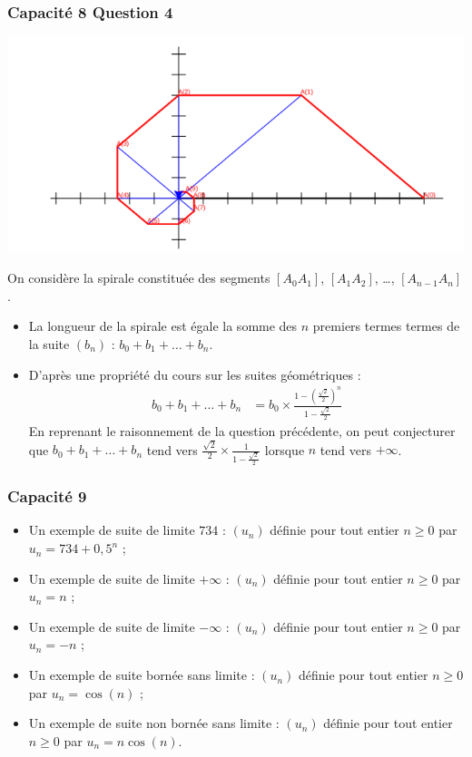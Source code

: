 \documentclass[11pt, hyperref={urlcolor=red,%
            linkcolor=blue, %
            colorlinks=true}]{beamer}
\begin{document}
\begin{frame}
\frametitle{Capacité 8 Question 4}


\begin{center}
\includegraphics[scale=0.15]{images/capacite8.png}
\end{center}



On considère la  spirale constituée des segments $[A_{0}A_{1}]$, $[A_{1}A_{2}]$, \ldots, $[A_{n-1}A_{n}]$. 

\begin{itemize}
	\pause \item La longueur de la spirale est égale  la somme des $n$ premiers termes termes de la suite $(b_{n})$ : $b_{0}+b_{1}+\ldots + b_{n}$.
	
	
\pause \item D'après une propriété du cours sur les suites géométriques : 
\begin{align*}
b_{0}+b_{1}+\ldots+b_{n} &=b_{0} \times \frac{1- \left(\frac{\sqrt{2}}{2}\right)^{n}}{1 - \frac{\sqrt{2}}{2}} 
\end{align*}
En reprenant le raisonnement de la question précédente, on peut conjecturer que $b_{0}+b_{1}+\ldots+b_{n}$ tend vers  
$\frac{\sqrt{2}}{2} \times \frac{1}{1 - \frac{\sqrt{2}}{2}}$ lorsque $n$ tend vers $+\infty$.
\end{itemize}


\end{frame}


\begin{frame}
\frametitle{Capacité 9}
\label{capacite9}

\begin{itemize}
\item Un exemple de suite de limite $734$  :  $(u_{n})$ définie pour tout entier $n \geqslant 0$ par $u_{n}=734+0,5^{n}$ ;
\item Un exemple de suite de limite $+\infty$ : $(u_{n})$ définie pour tout entier $n \geqslant 0$ par $u_{n}=n$ ;
\item Un exemple de suite de limite $-\infty$ : $(u_{n})$ définie pour tout entier $n \geqslant 0$ par $u_{n}=-n$ ;
\item Un exemple de suite bornée sans limite : $(u_{n})$ définie pour tout entier $n \geqslant 0$ par $u_{n}=\cos(n)$ ;
\item Un exemple de suite non bornée sans limite : $(u_{n})$ définie pour tout entier $n \geqslant 0$ par $u_{n}=n\cos(n)$.
\end{itemize}

\end{frame}
\end{document}
